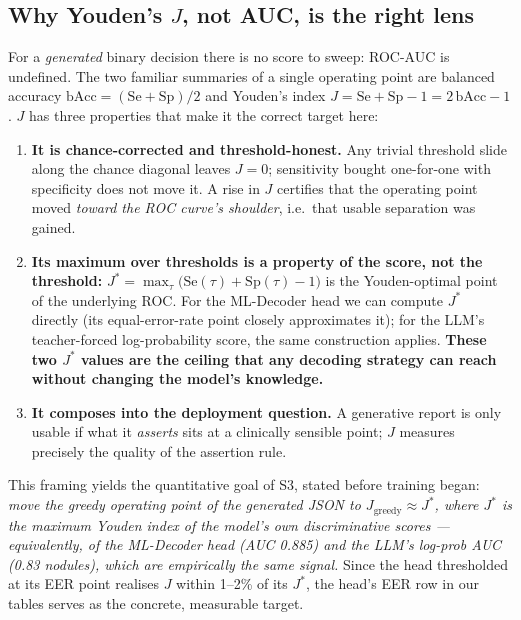 \documentclass[10pt,a4paper]{article}
\begin{document}
\subsection{Why Youden's $J$, not AUC, is the right lens}

For a \emph{generated} binary decision there is no score to sweep: ROC-AUC is
undefined. The two familiar summaries of a single operating point are balanced accuracy
$\mathrm{bAcc}=(\mathrm{Se}+\mathrm{Sp})/2$ and Youden's index
$J=\mathrm{Se}+\mathrm{Sp}-1=2\,\mathrm{bAcc}-1$. $J$ has three properties that make it
the correct target here:

\begin{enumerate}[leftmargin=1.6em,itemsep=1pt]
\item \textbf{It is chance-corrected and threshold-honest.} Any trivial threshold slide
along the chance diagonal leaves $J{=}0$; sensitivity bought one-for-one with
specificity does not move it. A rise in $J$ certifies that the operating point moved
\emph{toward the ROC curve's shoulder}, i.e.\ that usable separation was gained.
\item \textbf{Its maximum over thresholds is a property of the score, not the
threshold:} $J^{*}=\max_{\tau} \big(\mathrm{Se}(\tau)+\mathrm{Sp}(\tau)-1\big)$ is the
Youden-optimal point of the underlying ROC. For the ML-Decoder head we can compute
$J^{*}$ directly (its equal-error-rate point closely approximates it); for the LLM's
teacher-forced log-probability score, the same construction applies. \textbf{These two
$J^{*}$ values are the ceiling that any decoding strategy can reach without changing
the model's knowledge.}
\item \textbf{It composes into the deployment question.} A generative report is only
usable if what it \emph{asserts} sits at a clinically sensible point; $J$ measures
precisely the quality of the assertion rule.
\end{enumerate}

This framing yields the quantitative goal of S3, stated before training began:
\emph{move the greedy operating point of the generated JSON to
$J_{\mathrm{greedy}} \approx J^{*}$, where $J^{*}$ is the maximum Youden index of the
model's own discriminative scores --- equivalently, of the ML-Decoder head (AUC 0.885)
and the LLM's log-prob AUC (0.83 nodules), which are empirically the same signal.}
Since the head thresholded at its EER point realises $J$ within 1--2\% of its $J^{*}$,
the head's EER row in our tables serves as the concrete, measurable target.
\end{document}

